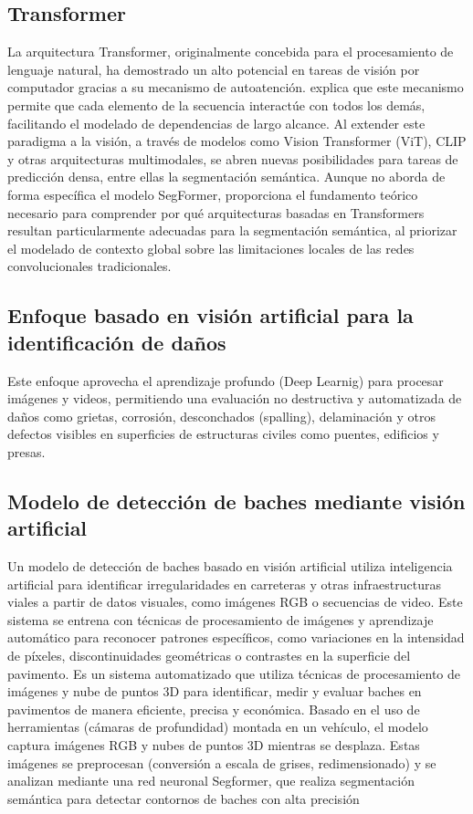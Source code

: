  \subsection{Transformer}
 La arquitectura Transformer, originalmente concebida para el procesamiento de lenguaje natural, ha demostrado un alto potencial en tareas de visión por computador gracias a su mecanismo de autoatención. \cite{rothman2024transformers} explica que este mecanismo permite que cada elemento de la secuencia interactúe con todos los demás, facilitando el modelado de dependencias de largo alcance. Al extender este paradigma a la visión, a través de modelos como Vision Transformer (ViT), CLIP y otras arquitecturas multimodales, se abren nuevas posibilidades para tareas de predicción densa, entre ellas la segmentación semántica. Aunque \cite{rothman2024transformers} no aborda de forma específica el modelo SegFormer, proporciona el fundamento teórico necesario para comprender por qué arquitecturas basadas en Transformers resultan particularmente adecuadas para la segmentación semántica, al priorizar el modelado de contexto global sobre las limitaciones locales de las redes convolucionales tradicionales.

\subsection{Enfoque basado en visión artificial para la identificación de daños}Este enfoque aprovecha el aprendizaje profundo (Deep Learnig) para procesar imágenes y videos, permitiendo una evaluación no destructiva y automatizada de daños como grietas, corrosión, desconchados (spalling), delaminación y otros defectos visibles en superficies de estructuras civiles como puentes, edificios y presas. 

\subsection{Modelo de detección de baches mediante visión artificial}
Un modelo de detección de baches basado en visión artificial utiliza inteligencia artificial para identificar irregularidades en carreteras y otras infraestructuras viales a partir de datos visuales, como imágenes RGB o secuencias de video. Este sistema se entrena con técnicas de procesamiento de imágenes y aprendizaje automático para reconocer patrones específicos, como variaciones en la intensidad de píxeles, discontinuidades geométricas o contrastes en la superficie del pavimento.
Es un sistema automatizado que utiliza técnicas de procesamiento de imágenes y nube de puntos 3D para identificar, medir y evaluar baches en pavimentos de manera eficiente, precisa y económica. Basado en el uso de herramientas (cámaras de profundidad) montada en un vehículo, el modelo captura imágenes RGB y nubes de puntos 3D mientras se desplaza. Estas imágenes se preprocesan (conversión a escala de grises, redimensionado) y se analizan mediante una red neuronal Segformer, que realiza segmentación semántica para detectar contornos de baches con alta precisión \textcite{TC2023hector}

